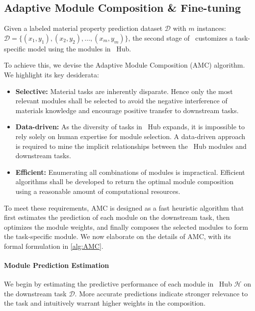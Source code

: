 \subsection{Adaptive Module Composition \& Fine-tuning}
\label{sec:AMC}
Given a labeled material property prediction dataset $\mathcal{D}$ with $m$ instances: $\mathcal{D}=\{(x_1,y_1), (x_2,y_2), \ldots, (x_m,y_m) \}$, the second stage of \name \ customizes a task-specific model using the modules in \name \ Hub.

To achieve this, we devise the Adaptive Module Composition (AMC) algorithm. We highlight its key desiderata:
\begin{itemize}[leftmargin=*]
\item \textbf{Selective:} Material tasks are inherently disparate. Hence only the most relevant modules shall be selected to avoid the negative interference of materials knowledge and encourage positive transfer to downstream tasks.
\item \textbf{Data-driven:} As the diversity of tasks in \name \ Hub expands, it is impossible to rely solely on human expertise for module selection. A data-driven approach is required to mine the implicit relationships between the \name \ Hub modules and downstream tasks.
\item \textbf{Efficient:} Enumerating all combinations of modules is impractical. Efficient algorithms shall be developed to return the optimal module composition using a reasonable amount of computational resources.
\end{itemize}

To meet these requirements, AMC is designed as a fast heuristic algorithm that first estimates the prediction of each module on the downstream task, then optimizes the module weights, and finally composes the selected modules to form the task-specific module. We now elaborate on the details of AMC, with its formal formulation in \cref{alg:AMC}.

\paragraph{Module Prediction Estimation}
We begin by estimating the predictive performance of each module in \name \ Hub $\mathcal{H}$ on the downstream task $\mathcal{D}$. More accurate predictions indicate stronger relevance to the task and intuitively warrant higher weights in the composition.

